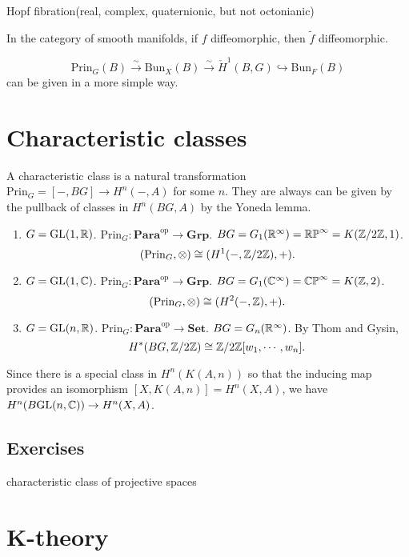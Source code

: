 \documentclass{../../large}
\begin{document}
Hopf fibration(real, complex, quaternionic, but not octonianic)

In the category of smooth manifolds, if $f$ diffeomorphic, then $\tilde f$ diffeomorphic.


\begin{prb}

\[\mathrm{Prin}_G(B)\xrightarrow{\sim}\mathrm{Bun}_X(B)\xrightarrow{\sim}\check H^1(B,G)\hookrightarrow\mathrm{Bun}_F(B)\]
can be given in a more simple way.

\end{prb}




\chapter{Characteristic classes}


A characteristic class is a natural transformation $\mathrm{Prin}_G=[-,BG]\to H^n(-,A)$ for some $n$.
They are always can be given by the pullback of classes in $H^n(BG,A)$ by the Yoneda lemma.
\begin{enumerate}
\item $G=\mathrm{GL}(1,\mathbb{R})$. $\mathrm{Prin}_G:\mathbf{Para}^{\mathrm{op}}\to\mathbf{Grp}$. $BG=G_1(\mathbb{R}^\infty)=\mathbb{RP}^\infty=K(\mathbb{Z}/2\mathbb{Z},1)$.
\[(\mathrm{Prin}_G,\otimes)\cong(H^1(-,\mathbb{Z}/2\mathbb{Z}),+).\]
\item $G=\mathrm{GL}(1,\mathbb{C})$. $\mathrm{Prin}_G:\mathbf{Para}^{\mathrm{op}}\to\mathbf{Grp}$. $BG=G_1(\mathbb{C}^\infty)=\mathbb{CP}^\infty=K(\mathbb{Z},2)$.
\[(\mathrm{Prin}_G,\otimes)\cong(H^2(-,\mathbb{Z}),+).\]
\item $G=\mathrm{GL}(n,\mathbb{R})$. $\mathrm{Prin}_G:\mathbf{Para}^{\mathrm{op}}\to\mathbf{Set}$. $BG=G_n(\mathbb{R}^\infty)$. By Thom and Gysin,
\[H^*(BG,\mathbb{Z}/2\mathbb{Z})\cong\mathbb{Z}/2\mathbb{Z}[w_1,\cdots,w_n].\]
\end{enumerate}



Since there is a special class in $H^n(K(A,n))$ so that the inducing map provides an isomorphism $[X,K(A,n)]=H^n(X,A)$, we have $H^n(B\mathrm{GL}(n,\mathbb{C}))\to H^n(X,A)$.



\section*{Exercises}

characteristic class of projective spaces




\chapter{K-theory}
\end{document}
